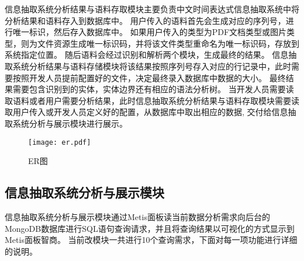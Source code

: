信息抽取系统分析结果与语料存取模块主要负责中文时间表达式信息抽取系统中将分析结果和语料存入到数据库中。
用户传入的语料首先会生成对应的序列号，进行唯一标识，然后存入数据库中。
如果用户传入的类型为PDF文档类型或图片类型，则为文件资源生成唯一标识码，并将该文件类型重命名为唯一标识码，存放到系统指定位置。
随后语料会经过识别和解析两个模块，生成最终的结果。
信息抽取系统分析结果与语料存储模块将该结果按照序列号存入对应的行记录中，此时需要按照开发人员提前配置好的文件，决定最终录入数据库中数据的大小。
最终结果需要包含识别到的实体，实体边界还有相应的语法分析树。
当开发人员需要读取语料或者用户需要分析结果，此时信息抽取系统分析结果与语料存取模块需要读取用户传入或开发人员定义好的配置，从数据库中取出相应的数据,
交付给信息抽取系统分析与展示模块进行展示。

\begin{figure}[h]
  \centering
  \texttt{[image: er.pdf]}
  \caption{ER图}
  \label{fig:er_graph}
\end{figure}

\subsection{信息抽取系统分析与展示模块}

信息抽取系统分析与展示模块通过Metis面板读当前数据分析需求向后台的MongoDB数据库进行SQL语句查询请求，并且将查询结果以可视化的方式显示到Metis面板智商。
当前改模块一共进行10个查询需求，下面对每一项功能进行详细的说明。

